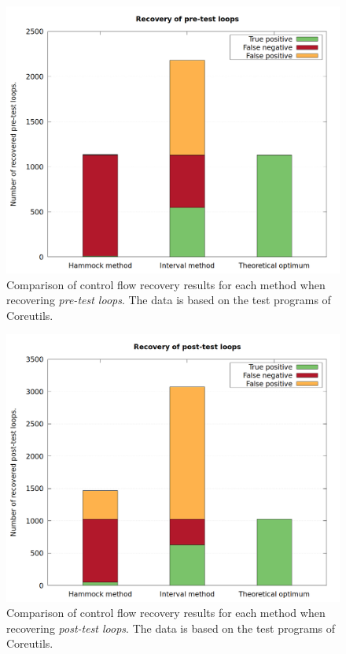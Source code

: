\begin{figure}[htbp]
	\centering
	\includegraphics[width=\textwidth]{inc/appendices/test_program_results/coreutils/results_pre_loop.png}
	\caption{Comparison of control flow recovery results for each method when recovering \textit{pre-test loops}. The data is based on the test programs of Coreutils.}
	\label{fig:coreutils_results_pre_loop}
\end{figure}

\begin{figure}[htbp]
	\centering
	\includegraphics[width=\textwidth]{inc/appendices/test_program_results/coreutils/results_post_loop.png}
	\caption{Comparison of control flow recovery results for each method when recovering \textit{post-test loops}. The data is based on the test programs of Coreutils.}
	\label{fig:coreutils_results_post_loop}
\end{figure}

